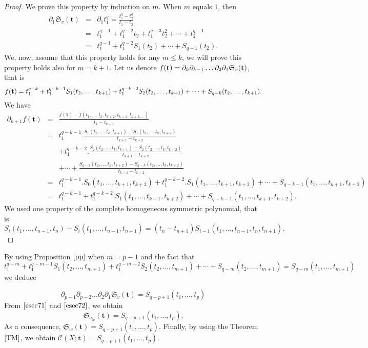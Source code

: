 \documentclass[11pt]{article}
\numberwithin{Property}{section}
\numberwithin{Theorem}{section}
\numberwithin{Proposition}{section}
\numberwithin{Lemma}{section}
\numberwithin{Corollary}{section}
\numberwithin{Definition}{section}
\numberwithin{Remark}{section}
\numberwithin{Conjecture}{section}
\numberwithin{Problem}{section}
\numberwithin{Example}{section}
\numberwithin{Claim}{section}
\renewcommand{\leq}{\leqslant}
\begin{document}
\begin{proof}
We prove this property by induction on $m$. When $m$ equals $1$, then 
\begin{eqnarray*}
\partial_1\mathfrak{S}_v(\mathbf{t}) &=& \partial_1t_1^{q} = \frac{t_1^q-t_2^q}{t_1 - t_2} \\
&=& t_1^{q-1} + t_1^{q-2}t_2 + t_1^{q-3}t_2^2 + \cdots + t_2^{q-1}\\
&=& t_1^{q-1} + t_1^{q-2}S_1({t_2}) + \cdots + S_{q-1}(t_2).
\end{eqnarray*}
We, now, assume that this property holds for any $m \leq k$, we will prove this property holds also for $m = k+1$. Let us denote $f({\bf{t}}) = \partial_{k}\partial_{k-1}\ldots\partial_2\partial_1\mathfrak{S}_v(\mathbf{t})$, that is 
\[
f({\bf{t}}) = t_1^{q-k} + t_1^{q-k-1}S_1(t_2, \ldots, t_{k+1}) + t_1^{q-k-2}S_2(t_2, \ldots, t_{k+1}) + \cdots + S_{q-k}(t_2, \ldots, t_{k+1}). 
\] We have 
\begin{eqnarray*}
\partial_{k+1}f(\mathbf{t})&=& \frac{f(\mathbf{t}) - f(t_1,\ldots, t_k, t_{k+2},t_{k+1}, t_{k+3, \ldots})}{t_k - t_{k+1}}\\
&=& t_1^{q-k-1}.\frac{S_1(t_2, \ldots ,t_k, t_{k+1}) - S_1(t_2, \ldots ,t_k, t_{k+2})}{t_{k+1}-t_{k+2}} \\
&{}& + t_1^{q-k-2}.\frac{S_2(t_2, \ldots ,t_k, t_{k+1}) - S_2(t_2, \ldots ,t_k, t_{k+2})}{t_{k+1}-t_{k+2}} \\ 
&{}& + \cdots + \frac{S_{q-k}(t_2, \ldots, t_k, t_{k+2}) - S_{q-k}(t_2, \ldots, t_k, t_{k+2})}{t_{k+1}-t_{k+2}}\\
&=& t_1^{q-k-1}.S_0(t_1, \ldots , t_{k+1}, t_{k+2}) + t_1^{q-k-2}.S_1(t_1, \ldots , t_{k+1}, t_{k+2}) + \cdots + S_{q-k-1}(t_1, \ldots , t_{k+1}, t_{k+2})\\
&=&t_1^{q-k-1} + t_1^{q-k-2}.S_1(t_1, \ldots , t_{k+1}, t_{k+2}) + \cdots + S_{q-k-1}(t_1, \ldots , t_{k+1}, t_{k+2}).
\end{eqnarray*}
We used one property of the complete homogeneous symmetric polynomial, that is 
\[
S_i(t_1, \ldots, t_{n-1}, t_n) - S_i(t_1, \ldots, t_{n-1}, t_{n+1}) = (t_n - t_{n+1})S_{i-1}(t_1, \ldots, t_{n-1}, t_n, t_{n+1}).\]
\end{proof}
By using Proposition $\ref{pp}$ when $m = p-1$ and the fact that \[ t_1^{q-m} + t_1^{q-m-1}S_1(t_2, \ldots, t_{m+1}) + t_1^{q-m-2}S_2(t_2, \ldots, t_{m+1}) + \cdots + S_{q-m}(t_2, \ldots, t_{m+1}) = S_{q-m}(t_1, \ldots, t_{m+1})\] we deduce 

\begin{equation} \label{esec71}
\partial_{p-1}\partial_{p-2}\ldots\partial_2\partial_1\mathfrak{S}_v(\mathbf{t}) = S_{q-p+1}(t_1, \ldots, t_{p})
\end{equation}
From $\cref{esec71}$ and $\cref{esec72}$, we obtain 
\[
\mathfrak{S}_{\sigma_{\tilde{w}}}(\mathbf{t}) = S_{q-p+1}(t_1, \ldots, t_p). 
\] As a consequence, $\mathfrak{S}_{w}(\mathbf{t}) = S_{q-p+1}(t_1, \ldots, t_p)$. Finally, by using the Theorem $\ref{TM}$, we obtain $\mathcal{C}(X;\mathbf{t}) = S_{q-p+1}(t_1, \ldots, t_p)$. 
\end{document}
